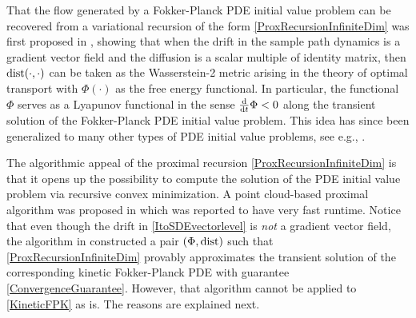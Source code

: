 \documentclass[10pt,twocolumn]{IEEEtran}
\newcommand{\differential}{{\rm{d}}}
\begin{document}
That the flow generated by a Fokker-Planck PDE initial value problem can be recovered from a variational recursion of the form \eqref{ProxRecursionInfiniteDim} was first proposed in \cite{jordan1998variational}, showing that when the drift in the sample path dynamics is a gradient vector field and the diffusion is a scalar multiple of identity matrix, then ${\rm{dist}}(\cdot,\cdot)$ can be taken as the Wasserstein-2 metric arising in the theory of optimal transport \cite{villani2003topics} with $\Phi(\cdot)$ as the free energy functional. In particular, the functional $\Phi$ serves as a Lyapunov functional in the sense $\frac{\differential}{\differential t}\Phi < 0$ along the transient solution of the Fokker-Planck PDE initial value problem. This idea has since been generalized to many other types of PDE initial value problems, see e.g., \cite{ambrosio2008gradient}. 

The algorithmic appeal of the proximal recursion \eqref{ProxRecursionInfiniteDim} is that it opens up the possibility to compute the solution of the PDE initial value problem via recursive convex minimization. A point cloud-based proximal algorithm was proposed in \cite{caluya2019ACC,caluya2019TAC} which was reported to have very fast runtime. Notice that even though the drift in \eqref{ItoSDEvectorlevel} is \emph{not} a gradient vector field, the algorithm in \cite[Sec. V.B]{caluya2019TAC} constructed a pair $\left(\Phi,{\rm{dist}}\right)$ such that \eqref{ProxRecursionInfiniteDim} provably approximates the transient solution of the corresponding kinetic Fokker-Planck PDE with guarantee \eqref{ConvergenceGuarantee}. However, that algorithm cannot be applied to \eqref{KineticFPK} as is. The reasons are explained next.
\end{document}
